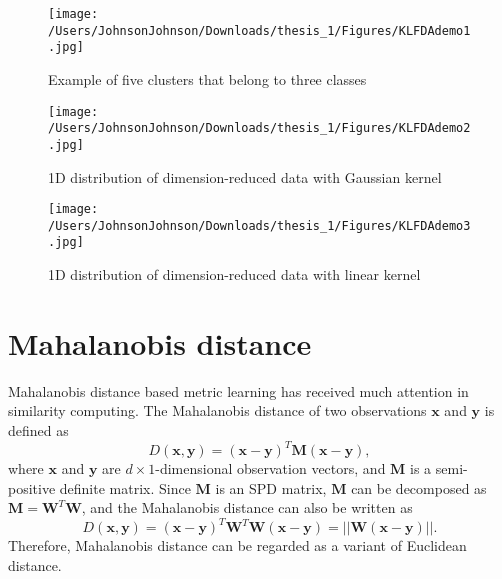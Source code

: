 \begin{figure}[H]
\centering
\texttt{[image: /Users/JohnsonJohnson/Downloads/thesis\_1/Figures/KLFDAdemo1.jpg]}
\caption{Example of five clusters that belong to three classes}
\label{KLFDAdemo1}
\vspace{-1em}
\end{figure} 


\begin{figure}[H]
\centering
\texttt{[image: /Users/JohnsonJohnson/Downloads/thesis\_1/Figures/KLFDAdemo2.jpg]}
\caption{1D distribution of dimension-reduced data with Gaussian kernel}
\label{KLFDAdemo2}
\vspace{-1em}
\end{figure} 


\begin{figure}[H]
\centering
\texttt{[image: /Users/JohnsonJohnson/Downloads/thesis\_1/Figures/KLFDAdemo3.jpg]}
\caption{1D distribution of dimension-reduced data with linear kernel}
\label{KLFDAdemo3}
\vspace{-1em}
\end{figure} 


\section{Mahalanobis distance}
Mahalanobis distance \cite{Mahadist} based metric learning has received much attention in similarity computing. The Mahalanobis distance of two observations $\bm{x} $ and $\bm{y}$ is defined as
\begin{equation}
\label{MahaDist}
D(\bm{x},\bm{y}) = (\bm{x} - \bm{y})^T\bm{M}(\bm{x} - \bm{y}), 
\end{equation}
where $\bm{x}$ and $\bm{y} $ are $d\times1$-dimensional observation vectors, and $\bm{M}$ is a semi-positive definite matrix. Since $\bm{M}$ is an SPD matrix, $\bm{M}$ can be decomposed as $\bm{M} = \bm{W}^T\bm{W}$, and the Mahalanobis distance can also be written as 
\begin{equation}
D(\bm{x},\bm{y}) = (\bm{x} - \bm{y})^T\bm{W}^T\bm{W}(\bm{x} - \bm{y})= ||\bm{W}(\bm{x} - \bm{y})||.
\end{equation}
 Therefore, Mahalanobis distance can be regarded as a variant of Euclidean distance.
 
